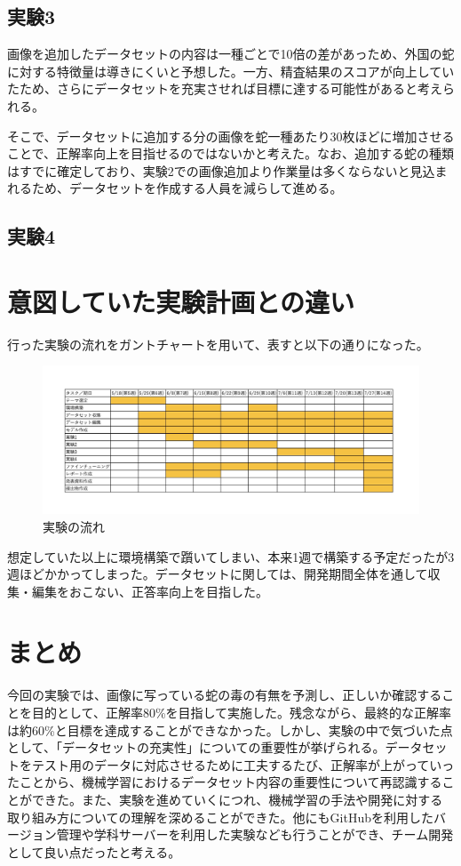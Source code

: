 \documentclass[a4paper, 11pt, titlepage]{jsarticle}
\begin{document}
\subsection{実験3}
画像を追加したデータセットの内容は一種ごとで10倍の差があっため、外国の蛇に対する特徴量は導きにくいと予想した。一方、精査結果のスコアが向上していたため、さらにデータセットを充実させれば目標に達する可能性があると考えられる。\par
そこで、データセットに追加する分の画像を蛇一種あたり30枚ほどに増加させることで、正解率向上を目指せるのではないかと考えた。なお、追加する蛇の種類はすでに確定しており、実験2での画像追加より作業量は多くならないと見込まれるため、データセットを作成する人員を減らして進める。

\subsection{実験4}

\clearpage

\section{意図していた実験計画との違い}
行った実験の流れをガントチャートを用いて、表すと以下の通りになった。\par
\begin{figure}[htbp]
\begin{center}
\includegraphics[width=150mm]{G2_Ganttchart.jpeg}
\caption{実験の流れ}
\end{center}
\end{figure}
想定していた以上に環境構築で躓いてしまい、本来1週で構築する予定だったが3週ほどかかってしまった。データセットに関しては、開発期間全体を通して収集・編集をおこない、正答率向上を目指した。

\section{まとめ}
今回の実験では、画像に写っている蛇の毒の有無を予測し、正しいか確認することを目的として、正解率80\%を目指して実施した。残念ながら、最終的な正解率は約60\%と目標を達成することができなかった。しかし、実験の中で気づいた点として、「データセットの充実性」についての重要性が挙げられる。データセットをテスト用のデータに対応させるために工夫するたび、正解率が上がっていったことから、機械学習におけるデータセット内容の重要性について再認識することができた。また、実験を進めていくにつれ、機械学習の手法や開発に対する取り組み方についての理解を深めることができた。他にもGitHubを利用したバージョン管理や学科サーバーを利用した実験なども行うことができ、チーム開発として良い点だったと考える。
\end{document}
